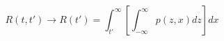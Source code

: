 \begin{equation}
R(t,t') \to R(t') = \int_{t'}^\infty \left[ \int_{-\infty}^\infty p(z,x) dz \right] dx
\end{equation}